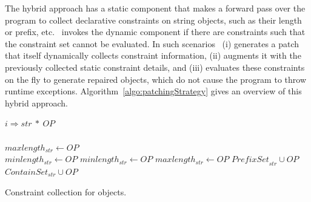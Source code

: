 The hybrid approach has a static component that makes a forward pass over the
program to collect declarative constraints on string objects, such as their
length or prefix, etc. \tool\ invokes the dynamic component if there are constraints
such that the constraint set cannot be evaluated. In
such scenarios \tool\ (i) generates a patch that itself dynamically collects
constraint information, (ii) augments it with the previously collected static
constraint details, and (iii) evaluates these constraints on the fly to generate
repaired  objects, which do not cause the program to throw runtime
exceptions. Algorithm~\ref{algo:patchingStrategy} gives an overview of this
hybrid approach.

\begin{algorithm}[t]
\scriptsize
\DontPrintSemicolon
{}
\Begin
{
  {
   $i \Rightarrow str\ *\ OP$ \\
    {\\
   \mytab $maxlength_{str} \longleftarrow OP$\\
   \mytab $minlength_{str} \longleftarrow OP$
   }  {
    $minlength_{str} \longleftarrow OP$
   }  {
    $maxlength_{str} \longleftarrow OP$
   }  {
    $\textit{PrefixSet}_{str} \cup OP$
   }  {
    $\textit{ContainSet}_{str} \cup OP$
   }
  }
}
\caption{Constraint collection for  objects.}
\label{algo:constraintCollection}
\end{algorithm}

